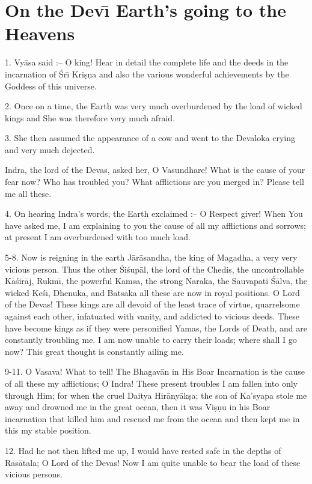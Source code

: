 \chapter{On the Dev\={\i} Earth's going to the Heavens}

1. Vy\=asa said :-- O king! Hear in detail the complete life and the deeds in the incarnation of \'Sr\={\i} Kri\d{s}\d{n}a and also the various wonderful achievements by the Goddess of this universe.

2. Once on a time, the Earth was very much overburdened by the load of wicked kings and She was therefore very much afraid.

3. She then assumed the appearance of a cow and went to the Devaloka crying and very much dejected.

Indra, the lord of the Devas, asked her, O Vasundhare! What is the cause of your fear now? Who has troubled you? What afflictions are you merged in? Please tell me all these.

4. On hearing Indra's words, the Earth exclaimed :-- O Respect giver! When You have asked me, I am explaining to you the cause of all my afflictions and sorrows; at present I am overburdened with too much load.

5-8. Now is reigning in the earth J\=ar\=asandha, the king of Magadha, a very very vicious person. Thus the other \'Si\'sup\=al, the lord of the Chedis, the uncontrollable K\=a\'sir\=aj, Rukm\={\i}, the powerful Kamsa, the strong Naraka, the Sauvapati \'S\=alva, the wicked Ke\'s\={\i}, Dhenuka, and Batsaka all these are now in royal positions. O Lord of the Devas! These kings are all devoid of the least trace of virtue, quarrelsome against each other, infatuated with vanity, and addicted to vicious deeds. These have become kings as if they were personified Yamas, the Lords of Death, and are constantly troubling me. I am now unable to carry their loads; where shall I go now? This great thought is constantly ailing me.

9-11. O Vasava! What to tell! The Bhagav\=an in His Boar Incarnation is the cause of all these my afflictions; O Indra! These present troubles I am fallen into only through Him; for when the cruel Daitya Hir\=any\=ak\d{s}a; the son of Ka'syapa stole me away and drowned me in the great ocean, then it was Vi\d{s}\d{n}u in his Boar incarnation that killed him and rescued me from the ocean and then kept me in this my stable position.

12. Had he not then lifted me up, I would have rested safe in the depths of Ras\=atala; O Lord of the Devas! Now I am quite unable to bear the load of these vicious persons.


